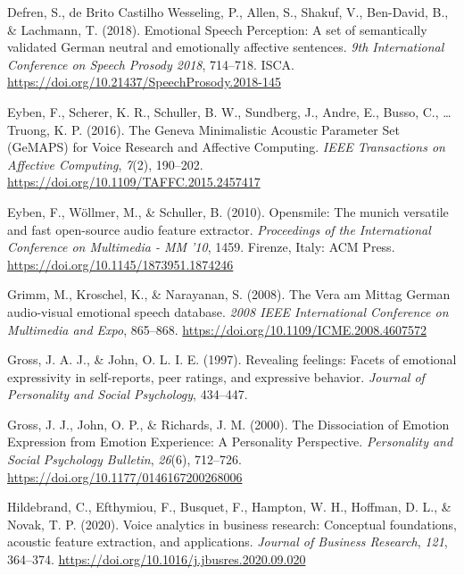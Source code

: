 \documentclass[
  english,
  man,floatsintext]{apa6}
\newlength{\cslhangindent}
\newenvironment{CSLReferences}[2] %
 {%
  \setlength{\parindent}{0pt}
  \ifodd #1 \everypar{\setlength{\hangindent}{\cslhangindent}}\ignorespaces\fi
  \ifnum #2 > 0
  \setlength{\parskip}{#2\baselineskip}
  \fi
 }%
 {}
\begin{document}
\begin{CSLReferences}{1}{0}
\leavevmode{}%
Defren, S., de Brito Castilho Wesseling, P., Allen, S., Shakuf, V., Ben-David, B., \& Lachmann, T. (2018). Emotional {Speech Perception}: {A} set of semantically validated {German} neutral and emotionally affective sentences. \emph{9th {International Conference} on {Speech Prosody} 2018}, 714--718. ISCA. \url{https://doi.org/10.21437/SpeechProsody.2018-145}

\leavevmode{}%
Eyben, F., Scherer, K. R., Schuller, B. W., Sundberg, J., Andre, E., Busso, C., \ldots{} Truong, K. P. (2016). The {Geneva Minimalistic Acoustic Parameter Set} ({GeMAPS}) for {Voice Research} and {Affective Computing}. \emph{IEEE Transactions on Affective Computing}, \emph{7}(2), 190--202. \url{https://doi.org/10.1109/TAFFC.2015.2457417}

\leavevmode{}%
Eyben, F., Wöllmer, M., \& Schuller, B. (2010). Opensmile: The munich versatile and fast open-source audio feature extractor. \emph{Proceedings of the International Conference on {Multimedia} - {MM} '10}, 1459. Firenze, Italy: ACM Press. \url{https://doi.org/10.1145/1873951.1874246}

\leavevmode{}%
Grimm, M., Kroschel, K., \& Narayanan, S. (2008). The {Vera} am {Mittag German} audio-visual emotional speech database. \emph{2008 {IEEE International Conference} on {Multimedia} and {Expo}}, 865--868. \url{https://doi.org/10.1109/ICME.2008.4607572}

\leavevmode{}%
Gross, J. A. J., \& John, O. L. I. E. (1997). Revealing feelings: {Facets} of emotional expressivity in self-reports, peer ratings, and expressive behavior. \emph{Journal of Personality and Social Psychology}, 434--447.

\leavevmode{}%
Gross, J. J., John, O. P., \& Richards, J. M. (2000). The {Dissociation} of {Emotion Expression} from {Emotion Experience}: {A Personality Perspective}. \emph{Personality and Social Psychology Bulletin}, \emph{26}(6), 712--726. \url{https://doi.org/10.1177/0146167200268006}

\leavevmode{}%
Hildebrand, C., Efthymiou, F., Busquet, F., Hampton, W. H., Hoffman, D. L., \& Novak, T. P. (2020). Voice analytics in business research: {Conceptual} foundations, acoustic feature extraction, and applications. \emph{Journal of Business Research}, \emph{121}, 364--374. \url{https://doi.org/10.1016/j.jbusres.2020.09.020}


\end{CSLReferences}
\end{document}
